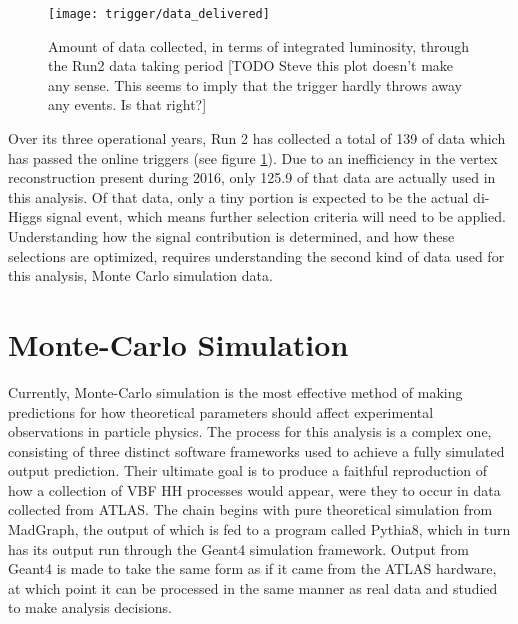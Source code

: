         \begin{figure}[h]
            \texttt{[image: trigger/data\_delivered]}
            \caption{Amount of data collected, in terms of integrated luminosity,
                through the Run2 data taking period\cite{data_quality}
                [TODO Steve this plot doesn't make any sense.
                This seems to imply that the trigger hardly throws away any events.
                Is that right?]}
            \label{fig:data_delivered}
        \end{figure}

        Over its three operational years, Run 2 has collected a total of 139 \ifb of data which has passed the online triggers
            (see figure \ref{fig:data_delivered}).
        Due to an inefficiency in the vertex reconstruction present during 2016,
            only 125.9 \ifb of that data are actually used in this analysis.
        Of that data, only a tiny portion is expected to be the actual di-Higgs signal event,
            which means further selection criteria will need to be applied.
        Understanding how the signal contribution is determined, and how these selections are optimized,
            requires understanding the second kind of data used for this analysis, Monte Carlo simulation data.


\FloatBarrier
\section{Monte-Carlo Simulation} \label{sec:mcsim}
    
    Currently, Monte-Carlo simulation is the most effective method of making predictions
        for how theoretical parameters should affect experimental observations in particle physics.
    The process for this analysis is a complex one, 
        consisting of three distinct software frameworks used to achieve a fully simulated output prediction.
    Their ultimate goal is to produce a faithful reproduction of how a collection of VBF \to HH processes would appear,
        were they to occur in data collected from ATLAS.
    The chain begins with pure theoretical simulation from MadGraph,
        the output of which is fed to a program called Pythia8,
        which in turn has its output run through the Geant4 simulation framework.
    Output from Geant4 is made to take the same form as if it came from the ATLAS hardware,
        at which point it can be processed in the same manner as real data and studied to make analysis decisions.


